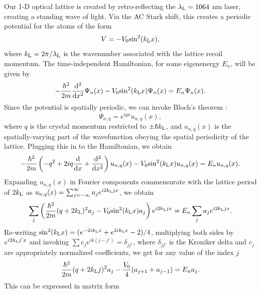 	Our 1-D optical lattice is created by retro-reflecting the  $\lambda_{\rm L} = 1064 $ nm laser, creating a standing wave of light. Via the AC Stark shift, this creates a periodic potential for the atoms of the form
\begin{equation}
V = - V_0 {\rm sin}^2 (k_{\rm L} x),
\end{equation} 
where $k_{\rm L} = 2\pi/\lambda_{\rm L}$ is the wavenumber associated with the lattice recoil momentum. The time-independent Hamiltonian, for some eigenenergy $E_n$, will be given by
\begin{equation}
-\frac{\hbar^2}{2 m}\frac{{\rm d}^2}{{\rm d}x^2}\Psi_n(x)-V_0 {\rm sin}^2 (k_{\rm L} x) \Psi_n(x) = E_n \Psi_n(x).
\end{equation}
Since the potential is spatially periodic, we can invoke Bloch's theorem \cite{Ashcroft}:
\begin{equation}
\Psi_{n,q} =  e^{iqx}u_{n,q}(x), 
\end{equation}
where $q$ is the crystal momentum restricted to $\pm\hbar k_{\rm L}$, and $u_{n,q}(x)$ is the spatially-varying part of the wavefunction obeying the spatial periodicity of the lattice. 
Plugging this in to the Hamiltonian, we obtain
\begin{equation}
-\frac{\hbar^2}{2m}\left(-q^2 + 2iq\frac{{\rm d}}{{\rm d}x} + \frac{{\rm d}^2}{{\rm d}x^2}\right) u_{n,q}(x) - V_0{\rm sin}^2(k_{\rm L} x) u_{n,q}(x) = E_n u_{n,q}(x).
\end{equation}
Expanding $u_{n,q}(x)$  in Fourier components commensurate with the lattice period of $2 k_{\rm L}$ as $u_{n,q}(x) = \sum_{j=-\infty}^{\infty} a_j e^{i 2 k_{\rm L} j x}$, we obtain
\begin{equation}
\sum_j \left(\frac{\hbar^2}{2m}(q + 2 k_{\rm L})^2 a_j - V_0 {\rm sin}^2(k_{\rm L} x) a_j\right) e^{i 2 k_{\rm L} j x} = E_n\sum_j a_j  e^{i 2 k_{\rm L} j x}.
\end{equation}
Re-writing ${\rm sin}^2(k_{\rm L} x) = (e^{-2ik_{\rm L} x} + e^{2 i k_{\rm L} x} - 2)/4$, multiplying both sides by $e^{i 2 k_{\rm L} j' x}$ and invoking $\sum c_j e^{i k (j-j')} = \delta_{jj'}$, where $\delta_{j j'}$ is the Kroniker delta and $c_j$ are appropriately normalized coefficients, we get for any value of the index $j$
\begin{equation}
\frac{\hbar^2}{2m}(q + 2 k_{\rm L} j)^2 a_j - \frac{V_0}{4}(a_{j+1}+a_{j-1}) = E_n a_j.
\end{equation}
This can be expressed in matrix form
